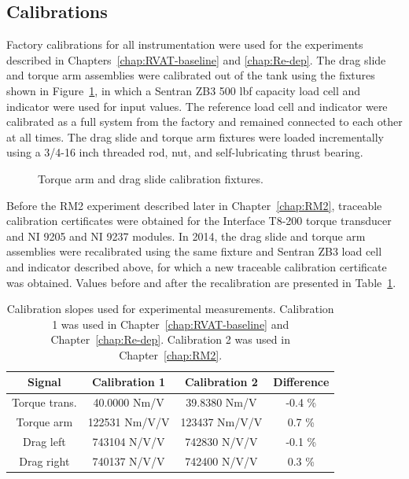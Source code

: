 \subsection{Calibrations}

Factory calibrations for all instrumentation were used for the experiments
described in Chapters~\ref{chap:RVAT-baseline} and \ref{chap:Re-dep}. The drag
slide and torque arm assemblies were calibrated out of the tank using the
fixtures shown in Figure~\ref{fig:calibration-fixtures}, in which a Sentran ZB3
500 lbf capacity load cell and indicator were used for input values. The
reference load cell and indicator were calibrated as a full system from the
factory and remained connected to each other at all times. The drag slide and
torque arm fixtures were loaded incrementally using a 3/4-16 inch threaded rod,
nut, and self-lubricating thrust bearing.

\begin{figure}
    \caption{Torque arm and drag slide calibration fixtures.}
    
    \label{fig:calibration-fixtures}
\end{figure}

Before the RM2 experiment described later in Chapter~\ref{chap:RM2}, traceable
calibration certificates were obtained for the Interface T8-200 torque
transducer and NI 9205 and NI 9237 modules. In 2014, the drag slide and torque
arm assemblies were recalibrated using the same fixture and Sentran ZB3 load
cell and indicator described above, for which a new traceable calibration
certificate was obtained. Values before and after the recalibration are
presented in Table~\ref{tab:calibrations}.

\begin{table}
    \centering
\begin{tabular}{c|c|c|c}
    Signal & Calibration 1 & Calibration 2 & Difference \\ 
    \hline 
    Torque trans. & 40.0000 Nm/V & 39.8380 Nm/V & -0.4 \% \\ 
    Torque arm & 122531 Nm/V/V & 123437 Nm/V/V & 0.7 \% \\ 
    Drag left & 743104 N/V/V & 742830 N/V/V & -0.1 \% \\ 
    Drag right & 740137 N/V/V & 742400 N/V/V & 0.3 \% \\ 
\end{tabular}
    \caption{Calibration slopes used for experimental measurements. Calibration
        1 was used in Chapter~\ref{chap:RVAT-baseline} and
        Chapter~\ref{chap:Re-dep}. Calibration 2 was used in
        Chapter~\ref{chap:RM2}.}
    
    \label{tab:calibrations}
\end{table}


